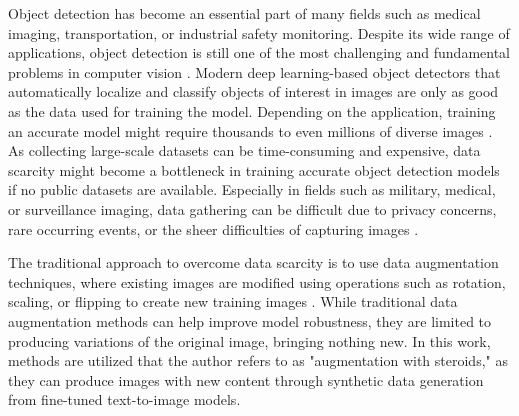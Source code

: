 Object detection has become an essential part of many fields such as medical imaging, transportation, or industrial safety monitoring. Despite its wide range of applications, object detection is still one of the most challenging and fundamental problems in computer vision \cite{object_detection_20years}. Modern deep learning-based object detectors that automatically localize and classify objects of interest in images are only as good as the data used for training the model. Depending on the application, training an accurate model might require thousands to even millions of diverse images \cite{optimalmedic, Kuznetsova_2020}. As collecting large-scale datasets can be time-consuming and expensive, data scarcity might become a bottleneck in training accurate object detection models if no public datasets are available. Especially in fields such as military, medical, or surveillance imaging, data gathering can be difficult due to privacy concerns, rare occurring events, or the sheer difficulties of capturing images \cite{akrout2023diffusionbaseddataaugmentationskin,tanks,app14114558, math11224588}.

The traditional approach to overcome data scarcity is to use data augmentation techniques, where existing images are modified using operations such as rotation, scaling, or flipping to create new training images \cite{10084010}. While traditional data augmentation methods can help improve model robustness, they are limited to producing variations of the original image, bringing nothing new. In this work, methods are utilized that the author refers to as "augmentation with steroids," as they can produce images with new content through synthetic data generation from fine-tuned text-to-image models.

